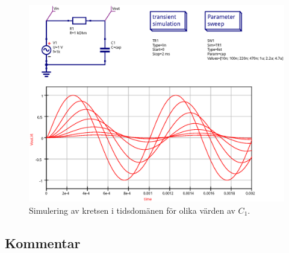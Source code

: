 \begin{figure}[ht]
    \centering
    \includegraphics[width=\linewidth]{sim/ee466_lab-4_prj/uppgift-1_param}
    \caption[] {Simulering av kretsen i tidsdomänen för olika värden av $C_1$.}
    \label{fig:bode-sim-param}
\end{figure}


\subsection{Kommentar}\label{}


